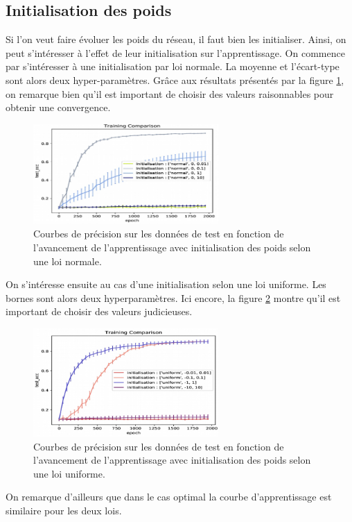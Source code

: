 \subsection{Initialisation des poids}
Si l'on veut faire évoluer les poids du réseau, il faut bien les initialiser. Ainsi, on peut s'intéresser à l'effet de leur initialisation sur l'apprentissage.
On commence par s'intéresser à une initialisation par loi normale. La moyenne et l'écart-type sont alors deux hyper-paramètres. Grâce aux résultats présentés par la figure \ref{MLP_initnormale}, on remarque bien qu'il est important de choisir des valeurs raisonnables pour obtenir une convergence.

\begin{figure}[!h]
\centering
\includegraphics[width=200pt]{"images/MLP/MLP_initnormale"}
\caption{Courbes de précision sur les données de test en fonction de l'avancement de l'apprentissage avec initialisation des poids selon une loi normale.}
\label{MLP_initnormale}
\end{figure}

On s'intéresse ensuite au cas d'une initialisation selon une loi uniforme. Les bornes sont alors deux hyperparamètres. Ici encore, la figure \ref{MLP_inituni} montre qu'il est important de choisir des valeurs judicieuses.


\begin{figure}[!h]
\centering
\includegraphics[width=200pt]{"images/MLP/MLP_inituni"}
\caption{Courbes de précision sur les données de test en fonction de l'avancement de l'apprentissage avec initialisation des poids selon une loi uniforme.}
\label{MLP_inituni}
\end{figure}

On remarque d'ailleurs que dans le cas optimal la courbe d'apprentissage est similaire pour les deux lois.

